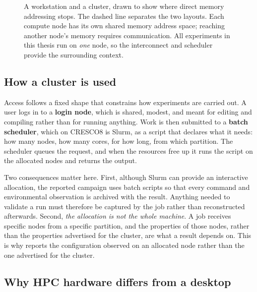 \begin{figure}[htbp]
{%
}
\endgroup
\caption{A workstation and a cluster, drawn to show where direct memory
addressing stops.  The dashed line separates the two layouts.  Each compute
node has its own shared memory address space; reaching another node's memory
requires communication.  All experiments in this thesis run on \emph{one}
node, so the interconnect and scheduler provide the surrounding context.
}
\label{fig:workstation-vs-cluster}
\end{figure}

\subsection{How a cluster is used}

Access follows a fixed shape that constrains how experiments are
carried out.  A user logs
in to a \textbf{login node}, which is shared, modest, and meant for
editing and compiling rather than for running anything.  Work is then
submitted to a \textbf{batch scheduler}, which on CRESCO8 is Slurm, as
a script that declares what it needs: how many nodes, how
many cores, for how long, from which partition.  The scheduler queues
the request, and when the resources free up it runs the script on the
allocated nodes and returns the output.

Two consequences matter here.  First, although Slurm can provide an
interactive allocation, the reported campaign uses batch scripts so
that every command and environmental observation is archived with the
result.  Anything needed to validate a run must therefore be captured by
the job rather than reconstructed afterwards.  Second, \emph{the
allocation is not the whole machine}.  A job receives specific nodes
from a specific partition, and the properties of those nodes, rather than
the properties advertised for the cluster, are what a result depends
on.  This is why  reports the configuration
observed on an allocated node rather than the one advertised for the
cluster.

\subsection{Why HPC hardware differs from a desktop}

